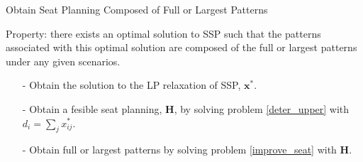 \begin{frame}{Obtain Seat Planning Composed of Full or Largest Patterns}

  Property: there exists an optimal solution to SSP such that the patterns associated with this {\color{red} optimal solution} are composed of the {\color{red} full or largest patterns} under any given scenarios.
  \vspace{0.5cm}


  \begin{itemize}
    \item[-] Obtain the solution to the LP relaxation of SSP, $\mathbf{x}^{*}$. 
    \vspace{0.2cm}

    \item[-] Obtain a fesible seat planning, $\bm{H}$, by solving problem \eqref{deter_upper} with $d_{i} = \sum_{j} x^{*}_{ij}$. 
    \vspace{0.2cm}
     
    \item[-] Obtain full or largest patterns by solving problem \eqref{improve_seat} with $\bm{H}$.
 \end{itemize}
\end{frame}
